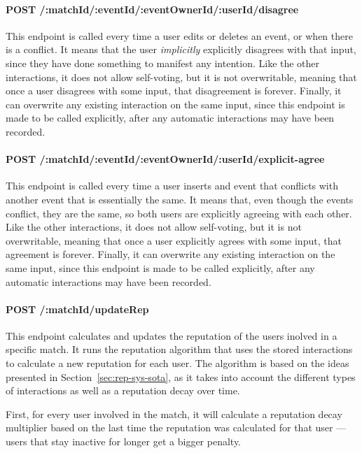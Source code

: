 \paragraph{POST /:matchId/:eventId/:eventOwnerId/:userId/disagree}

This endpoint is called every time a user edits or deletes an event, or when there is a conflict. It means that the user \textit{implicitly} explicitly disagrees with that input, since they have done something to manifest any intention. Like the other interactions, it does not allow self-voting, but it is not overwritable, meaning that once a user disagrees with some input, that disagreement is forever. Finally, it can overwrite any existing interaction on the same input, since this endpoint is made to be called explicitly, after any automatic interactions may have been recorded.

\paragraph{POST /:matchId/:eventId/:eventOwnerId/:userId/explicit-agree}

This endpoint is called every time a user inserts and event that conflicts with another event that is essentially the same. It means that, even though the events conflict, they are the same, so both users are explicitly agreeing with each other. Like the other interactions, it does not allow self-voting, but it is not overwritable, meaning that once a user explicitly agrees with some input, that agreement is forever. Finally, it can overwrite any existing interaction on the same input, since this endpoint is made to be called explicitly, after any automatic interactions may have been recorded.

\paragraph{POST /:matchId/updateRep}

This endpoint calculates and updates the reputation of the users inolved in a specific match. It runs the reputation algorithm that uses the stored interactions to calculate a new reputation for each user. The algorithm is based on the ideas presented in Section~\ref{sec:rep-sys-sota}, as it takes into account the different types of interactions as well as a reputation decay over time.

First, for every user involved in the match, it will calculate a reputation decay multiplier based on the last time the reputation was calculated for that user --- users that stay inactive for longer get a bigger penalty. 

